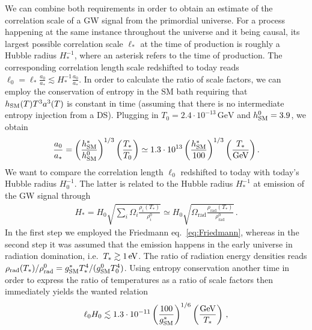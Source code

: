 We can combine both requirements in order to obtain an estimate of the correlation scale of a \ac{GW} signal from the primordial universe. For a process happening at the same instance throughout the universe and it being causal, its largest possible correlation scale $\ell_*$ at the time  of production is roughly a Hubble radius $H_*^{-1}$, where an asterisk refers to the time of production. The corresponding correlation length scale redshifted to today reads $\ell_0 = \ell_* \frac{a_0}{a_*} \lesssim H_*^{-1} \frac{a_0}{a_*}$. In order to calculate the ratio of scale factors, we can employ the conservation of entropy in the \ac{SM} bath requiring that $h_{\text{SM}}(T) T^3 a^3(T)$ is constant in time (assuming that there is no intermediate entropy injection from a \ac{DS}). Plugging in $T_0 = 2.4 \cdot 10^{-13} \, \text{GeV}$ and $h_{\text{SM}}^0 = 3.9$, we obtain 
\begin{align}
	\frac{a_0}{a_*} = \left( \frac{h_{\text{SM}}^*}{h_{\text{SM}}^0} \right)^{1/3} \left( \frac{T_*}{T_0} \right)  \simeq 1.3 \cdot 10^{13} \left( \frac{h_{\text{SM}}^*}{100} \right)^{1/3} \left( \frac{T_*}{\text{GeV}} \right)  . \label{eq:aratio}
\end{align}
We want to compare the correlation length $\ell_0$ redshifted to today with today's Hubble radius $H_0^{-1}$. The latter is related to the Hubble radius $H_*^{-1}$ at emission of the \ac{GW} signal through
\begin{align}
	H_* = H_0 \sqrt{\sum_i \Omega_i \frac{\rho_i(T_*)}{\rho_i^0}} \simeq H_0 \sqrt{\Omega_\text{rad} \frac{\rho_\text{rad}(T_*)}{\rho_\text{rad}^0}}\, .  \label{eq:Hratio}
\end{align}
In the first step we employed the Friedmann eq.~\eqref{eq:Friedmann}, whereas in the second step it was assumed that the emission happens in the early universe in radiation domination, i.e.~$T_*\gtrsim 1 \, \text{eV}$. The ratio of radiation energy densities reads $\rho_\text{rad}(T_*) / \rho_\text{rad}^0 = g_{\text{SM}}^* T_*^4 /(g_{\text{SM}}^0 T_0^4)$. Using entropy conservation another time in order to express the ratio of temperatures as a ratio of scale factors then immediately yields the wanted relation
\begin{align}
	\ell_0 H_0 \lesssim 1.3 \cdot 10^{-11} \left( \frac{100}{g_{\text{SM}}^*} \right)^{1/6} \left( \frac{\text{GeV}}{T_*} \right) \, ,
\end{align}

